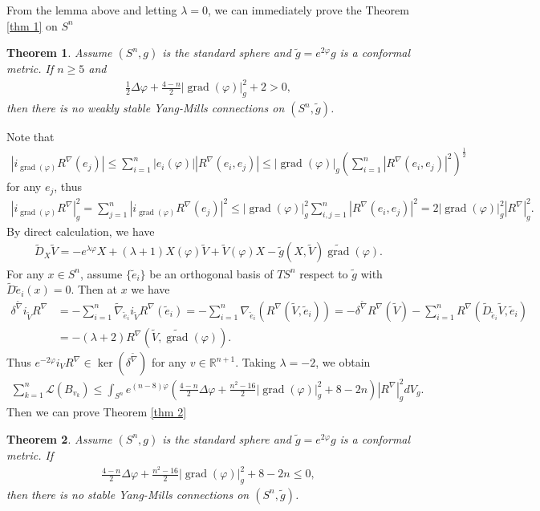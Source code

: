 \documentclass{amsart}
\newtheorem{theorem}{Theorem}[section]
\begin{document}
	From the lemma above and letting $\lambda=0$, we can immediately prove the Theorem \ref{thm 1} on $S^n$
	\begin{theorem}
		Assume $(S^n,g)$ is the standard sphere and $\tilde g=e^{2\varphi}g$ is a conformal metric. If $n\ge5$ and
		\begin{align*}
			\frac12\Delta\varphi+\frac{4-n}2|\operatorname{grad}(\varphi)|_g^2+2>0,
		\end{align*}
		then there is no weakly stable Yang-Mills connections on $(S^n,\tilde g)$.
	\end{theorem}
	Note that
	\begin{align*}
		|i_{\operatorname{grad}(\varphi)}R^\nabla(e_j)|\le\sum_{i=1}^n|e_i(\varphi)||R^\nabla(e_i,e_j)|\le|\operatorname{grad}(\varphi)|_g(\sum_{i=1}^n|R^\nabla(e_i,e_j)|^2)^{\frac12}
	\end{align*}
	for any $e_j$, thus
	\begin{align*}
		|i_{\operatorname{grad}(\varphi)}R^\nabla|_g^2=\sum_{j=1}^n|i_{\operatorname{grad}(\varphi)}R^\nabla(e_j)|^2\le|\operatorname{grad}(\varphi)|_g^2\sum_{i,j=1}^n|R^\nabla(e_i,e_j)|^2=2|\operatorname{grad}(\varphi)|_g^2|R^\nabla|_g^2.
	\end{align*}
	By direct calculation, we have
	\begin{align*}
		\tilde D_X\tilde V=-e^{\lambda\varphi}X+(\lambda+1)X(\varphi)\tilde V+\tilde V(\varphi)X-\tilde g(X,\tilde V)\widetilde{\operatorname{grad}}(\varphi).
	\end{align*}
	For any $x\in S^n$, assume $\{\tilde e_i\}$ be an orthogonal basis of $TS^n$ respect to $\tilde g$ with $\tilde D\tilde e_i(x)=0$. Then at $x$ we have
	\begin{align*}
		\delta^{\tilde\nabla}i_{\tilde V}R^\nabla&=-\sum_{i=1}^n\tilde\nabla_{\tilde e_i}i_{\tilde V}R^\nabla(\tilde e_i)=-\sum_{i=1}^n\nabla_{\tilde e_i}(R^\nabla(\tilde V,\tilde e_i))=-\delta^{\tilde\nabla}R^\nabla(\tilde V)-\sum_{i=1}^nR^\nabla(\tilde D_{\tilde e_i}\tilde V,\tilde e_i)\\
		&=-(\lambda+2)R^\nabla(\tilde V,\widetilde{\operatorname{grad}}(\varphi)).
	\end{align*}
	Thus $e^{-2\varphi}i_VR^\nabla\in\operatorname{ker}(\delta^{\tilde\nabla})$ for any $v\in\mathbb{R}^{n+1}$. Taking $\lambda=-2$, we obtain
	\begin{align*}
		\sum_{k=1}^n\mathscr{L}(B_{v_k})\le\int_{S^n}e^{(n-8)\varphi}(\frac{4-n}2\Delta\varphi+\frac{n^2-16}2|\operatorname{grad}(\varphi)|_g^2+8-2n)|R^\nabla|_g^2dV_g.
	\end{align*}
	Then we can prove Theorem \ref{thm 2}
	\begin{theorem}
		Assume $(S^n,g)$ is the standard sphere and $\tilde g=e^{2\varphi}g$ is a conformal metric. If
		\begin{align*}
			\frac{4-n}2\Delta\varphi+\frac{n^2-16}2|\operatorname{grad}(\varphi)|_g^2+8-2n\le0,
		\end{align*}
		then there is no stable Yang-Mills connections on $(S^n,\tilde g)$.	
	\end{theorem}
\end{document}
